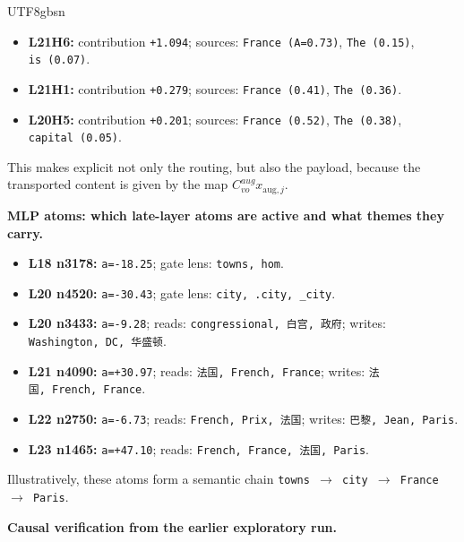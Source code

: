 \documentclass[11pt]{article}
\providecommand{\tightlist}{\setlength{\itemsep}{0pt}\setlength{\parskip}{0pt}}
\begin{document}
\begin{CJK*}{UTF8}{gbsn}
\begin{itemize}
\tightlist
\item
  \textbf{L21H6:} contribution \texttt{+1.094}; sources:
  \texttt{\textquotesingle{}France\textquotesingle{}\ (A=0.73)},
  \texttt{\textquotesingle{}The\textquotesingle{}\ (0.15)},
  \texttt{\textquotesingle{}is\textquotesingle{}\ (0.07)}.
\item
  \textbf{L21H1:} contribution \texttt{+0.279}; sources:
  \texttt{\textquotesingle{}France\textquotesingle{}\ (0.41)},
  \texttt{\textquotesingle{}The\textquotesingle{}\ (0.36)}.
\item
  \textbf{L20H5:} contribution \texttt{+0.201}; sources:
  \texttt{\textquotesingle{}France\textquotesingle{}\ (0.52)},
  \texttt{\textquotesingle{}The\textquotesingle{}\ (0.38)},
  \texttt{\textquotesingle{}capital\textquotesingle{}\ (0.05)}.
\end{itemize}

This makes explicit not only the routing, but also the payload, because
the transported content is given by the map
\(C_{vo}^{aug}x_{\mathrm{aug},j}\).

\textbf{MLP atoms: which late-layer atoms are active and what themes
they carry.}

\begin{itemize}
\tightlist
\item
  \textbf{L18 n3178:} \texttt{a=-18.25}; gate lens:
  \texttt{towns,\ hom}.
\item
  \textbf{L20 n4520:} \texttt{a=-30.43}; gate lens:
  \texttt{city,\ .city,\ \_city}.
\item
  \textbf{L20 n3433:} \texttt{a=-9.28}; reads:
  \texttt{congressional,\ 白宫,\ 政府}; writes:
  \texttt{Washington,\ DC,\ 华盛顿}.
\item
  \textbf{L21 n4090:} \texttt{a=+30.97}; reads:
  \texttt{法国,\ French,\ France}; writes:
  \texttt{法国,\ French,\ France}.
\item
  \textbf{L22 n2750:} \texttt{a=-6.73}; reads:
  \texttt{French,\ Prix,\ 法国}; writes: \texttt{巴黎,\ Jean,\ Paris}.
\item
  \textbf{L23 n1465:} \texttt{a=+47.10}; reads:
  \texttt{French,\ France,\ 法国,\ Paris}.
\end{itemize}

Illustratively, these atoms form a semantic chain
\texttt{towns\ $\rightarrow$\ city\ $\rightarrow$\ France\ $\rightarrow$\ Paris}.

\textbf{Causal verification from the earlier exploratory run.}


\end{CJK*}
\end{document}
